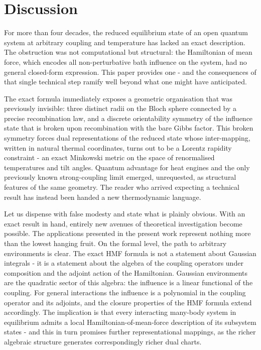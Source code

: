 \section{Discussion}
\label{sec:discussion}

For more than four decades, the reduced equilibrium state of an open quantum system at arbitrary
coupling and temperature has lacked an exact description. The obstruction was not computational but
structural: the Hamiltonian of mean force, which encodes all non-perturbative bath influence on the
system, had no general closed-form expression. This paper provides one - and the consequences of
that single technical step ramify well beyond what one might have anticipated.

The exact formula immediately exposes a geometric organisation that was previously invisible: three
distinct radii on the Bloch sphere connected by a precise recombination law, and a discrete
orientability symmetry of the influence state that is broken upon recombination with the bare Gibbs
factor. This broken symmetry forces dual representations of the reduced state whose inter-mapping,
written in natural thermal coordinates, turns out to be a Lorentz rapidity constraint - an exact
Minkowski metric on the space of renormalised temperatures and tilt angles. Quantum advantage for
heat engines and the only previously known strong-coupling limit emerged, unrequested, as
structural features of the same geometry. The reader who arrived expecting a technical result has
instead been handed a new thermodynamic language.

Let us dispense with false modesty and state what is plainly obvious. With an exact result in hand, entirely new avenues of theoretical investigation become possible. The applications presented in the present work represent nothing more than the lowest hanging fruit. On the formal level, the path to arbitrary environments is clear. The exact HMF formula is not a
statement about Gaussian integrals - it is a statement about the algebra of the coupling operators
under composition and the adjoint action of the Hamiltonian. Gaussian environments are the
quadratic sector of this algebra: the influence is a linear functional of the coupling. For general
interactions the influence is a polynomial in the coupling operator and its adjoints, and the
closure properties of the HMF formula extend accordingly. The implication is that every
interacting many-body system in equilibrium admits a local Hamiltonian-of-mean-force description
of its subsystem states - and this in turn promises further representational mappings, as the
richer algebraic structure generates correspondingly richer dual charts.

